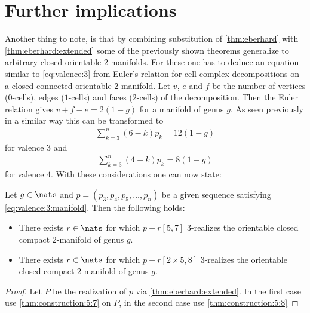 \section{Further implications}

Another thing to note, is that by combining substitution of \autoref{thm:eberhard} with \autoref{thm:eberhard:extended} some of the previously shown theorems generalize to arbitrary closed orientable 2-manifolds. For these one has to deduce an equation similar to  \autoref{eq:valence:3} from Euler's relation for cell complex decompositions on a closed connected orientable $2$-manifold. Let $v$, $e$ and $f$ be the number of vertices ($0$-cells), edges ($1$-cells) and faces ($2$-cells) of the decomposition. Then the Euler relation gives $v + f - e = 2(1-g)$ for a manifold of genus $g$. As seen previously in a similar way this can be transformed to
\begin{align}
  \sum_{k=3}^n \left(6 - k \right) p_k = 12(1-g) \label{eq:valence:3:manifold}
\end{align}
for valence $3$ and
\begin{align}
  \sum_{k=3}^n \left(4 - k \right) p_k = 8(1-g)  \label{eq:valence:4:manifold}
\end{align}
for valence $4$. With these considerations one can now state:
\begin{theorem}
  Let $g \in \nats$ and $p = (p_3, p_4, p_5, \dots, p_n)$ be a given sequence satisfying \autoref{eq:valence:3:manifold}. Then the following holds:
  \begin{itemize}
  \item There exists $r \in \nats$ for which $p + r [5, 7]$ $3$-realizes the orientable closed compact 2-manifold of genus $g$.
  \item There exists $r \in \nats$ for which $p + r [2 \times 5, 8]$ $3$-realizes the orientable closed compact 2-manifold of genus $g$.
  \end{itemize}
  \begin{proof}
    Let $P$ be the realization of $p$ via \autoref{thm:eberhard:extended}. In the first case use \autoref{thm:construction:5:7} on $P$, in the second case use \autoref{thm:construction:5:8}
  \end{proof}
\end{theorem}

